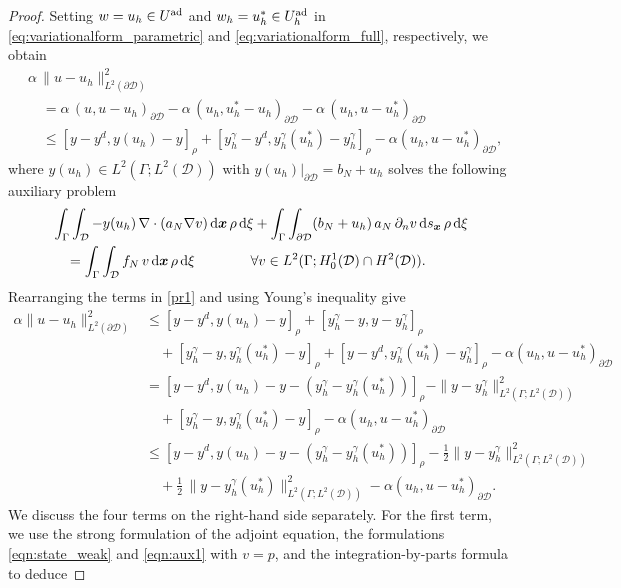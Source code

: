 \documentclass[a4paper,10pt]{article}
\newcommand{\bx}{{\boldsymbol{x}}}
\newcommand{\cD}{{\mathcal{D}}}
\renewcommand{\d}{\textup{d}}
\newcommand{\yL}{{L^2(\Gamma;L^2(\cD))}}
\numberwithin{theorem}{section}
\begin{document}
\begin{proof}
Setting $w=u_h \in U^{\textup{ad}}$ and $w_h= u_h^* \in U_h^{\textup{ad}}$ in \eqref{eq:variationalform_parametric} and \eqref{eq:variationalform_full}, respectively, we obtain
\begin{align}\label{pr1}
&\alpha\,\|u-u_h\|_{L^2(\partial \cD)}^2 \nonumber \\
& \quad =  \alpha\,(u, u-u_h)_{\partial\cD}
- \alpha\,(u_h, u_h^*-u_h)_{\partial\cD}
- \alpha\,(u_h,u-u_h^*)_{\partial\cD}
\nonumber \\
& \quad \le  [y- y^d, y(u_h) - y]_\rho
            +  [y_h^{\gamma} - y^d, y_h^{\gamma}(u_h^*) -  y_h^{\gamma}]_\rho - \alpha (u_h,u-u_h^*)_{\partial\cD},
\end{align}
where $y(u_h) \in L^2(\Gamma;L^2(\cD))$ with $y(u_h)|_{\partial \cD} =  b_N + u_h$ solves the following auxiliary problem 
\begin{align}\label{eqn:aux1}
  & \int_\Gamma \int_\cD - y(u_h)  \, \nabla \cdot (a_N \nabla v)   \, \d \bx\,\rho\, \d\xi + \int_\Gamma \int_{\partial\cD} (b_N + u_h)\, a_N \,  \partial_n v\,\d s_\bx
  \, \rho\,\d\xi \nonumber \\ 
  &\quad  = \int_\Gamma \int_\cD f_N \,v \,\d \bx \, \rho\, \d\xi \qquad\qquad \forall  v \in L^2(\Gamma; H_0^1(\cD) \cap H^2(\cD)).
\end{align}
Rearranging the terms in \eqref{pr1} and using Young's inequality give
\begin{align}\label{pr2}
\alpha\|u-u_h\|_{L^2(\partial \cD)}^2
& \le [y - y^d, y(u_h) - y]_{\rho} + [ y_h^{\gamma} - y, y -y_h^{\gamma}]_{\rho} \nonumber \\
& \quad + [y_h^{\gamma} - y, y_h^{\gamma}(u_h^*) - y]_{\rho} + [y - y^d, y_h^{\gamma}(u_h^*) - y_h^{\gamma}]_{\rho}
- \alpha (u_h,u-u_h^*)_{\partial\cD}\nonumber \\
&  =  [y - y^d, y(u_h) - y -  ( y_h^{\gamma} - y_h^{\gamma}(u_h^*) ) ]_{\rho} - \|y - y_h^{\gamma}\|_{\yL}^2\nonumber \\
& \quad + [y_h^{\gamma} - y, y_h^{\gamma}(u_h^*) - y]_{\rho} - \alpha (u_h,u-u_h^*)_{\partial\cD} \nonumber \\
&  \leq [y - y^d, y(u_h) - y -  ( y_h^{\gamma} - y_h^{\gamma}(u_h^*) ) ]_{\rho} - \frac12 \|y - y_h^{\gamma}\|_{\yL}^2\nonumber \\
& \quad  +  \frac12\,\|y - y_h^{\gamma}(u_h^*)\|_{\yL}^2 - \alpha (u_h,u-u_h^*)_{\partial\cD}.
\end{align}
We discuss the four terms on the right-hand side separately. For the first term, we use the strong formulation of the adjoint equation, the formulations \eqref{eqn:state_weak} and \eqref{eqn:aux1} with $v=p$,  and the integration-by-parts formula to deduce

\end{proof}
\end{document}
